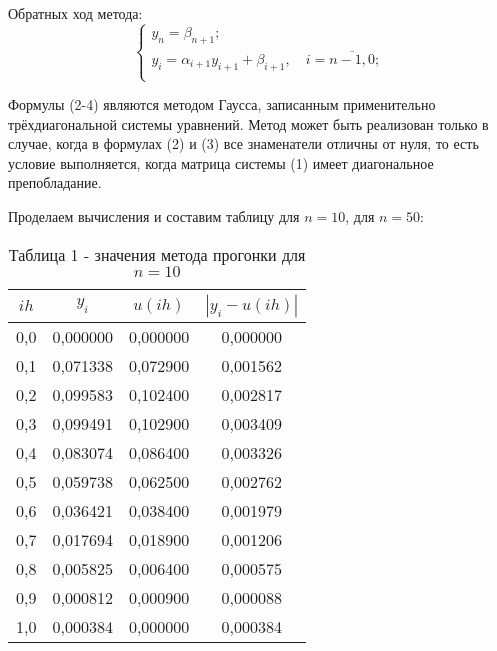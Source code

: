 \documentclass[a4paper,12pt]{article}
\begin{document}
{Обратных ход метода:
\begin{equation}
    \begin{cases}
        y_n = \beta_{n+1};\\
        y_i = \alpha_{i+1}y_{i+1} + \beta_{i+1}, \quad i = \overline{n-1, 0};\\
    \end{cases}
\end{equation}

Формулы (2-4) являются методом Гаусса, записанным применительно трёх\-диаго\-наль\-ной системы уравнений. 
Метод может быть реализован только в случае, когда в формулах (2) и (3) все знаменатели отличны от нуля, 
то есть условие выполняется, когда матрица системы (1) имеет диагональное препобладание.

Проделаем вычисления и составим таблицу для $n = 10$, для $n = 50$:
\begin{table}[h]
    \centering
    \begin{tabular}{|c|c|c|c|}
        \hline
        $ih$ & $y_i$ & $u(ih)$ & $\left|y_i - u(ih)\right|$\\
        \hline
        0,0 & 0,000000  & 0,000000  & 0,000000  \\           
        \hline
        0,1 & 0,071338  & 0,072900  & 0,001562  \\
        \hline
        0,2 & 0,099583  & 0,102400  & 0,002817  \\
        \hline
        0,3 & 0,099491  & 0,102900  & 0,003409  \\
        \hline
        0,4 & 0,083074  & 0,086400  & 0,003326  \\
        \hline
        0,5 & 0,059738  & 0,062500  & 0,002762  \\
        \hline
        0,6 & 0,036421  & 0,038400  & 0,001979  \\
        \hline
        0,7 & 0,017694  & 0,018900  & 0,001206  \\
        \hline
        0,8 & 0,005825  & 0,006400  & 0,000575  \\
        \hline
        0,9 & 0,000812  & 0,000900  & 0,000088  \\
        \hline
        1,0 & 0,000384  & 0,000000  & 0,000384  \\
        \hline
    \end{tabular}
    \caption*{\small{Таблица 1 - значения метода прогонки для $n = 10$}}
\end{table}
\begin{table}[h]
    \centering
    \begin{tabular}{|c|c|c|c|}

\end{tabular}
\end{table}}
\end{document}
